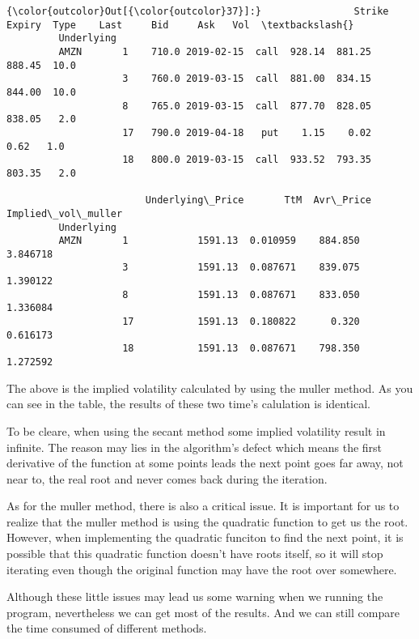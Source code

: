 \documentclass[11pt]{article}
\begin{document}
\begin{Verbatim}[commandchars=\\\{\}]
{\color{outcolor}Out[{\color{outcolor}37}]:}                Strike     Expiry  Type    Last     Bid     Ask   Vol  \textbackslash{}
         Underlying                                                             
         AMZN       1    710.0 2019-02-15  call  928.14  881.25  888.45  10.0   
                    3    760.0 2019-03-15  call  881.00  834.15  844.00  10.0   
                    8    765.0 2019-03-15  call  877.70  828.05  838.05   2.0   
                    17   790.0 2019-04-18   put    1.15    0.02    0.62   1.0   
                    18   800.0 2019-03-15  call  933.52  793.35  803.35   2.0   
         
                        Underlying\_Price       TtM  Avr\_Price  Implied\_vol\_muller  
         Underlying                                                                
         AMZN       1            1591.13  0.010959    884.850            3.846718  
                    3            1591.13  0.087671    839.075            1.390122  
                    8            1591.13  0.087671    833.050            1.336084  
                    17           1591.13  0.180822      0.320            0.616173  
                    18           1591.13  0.087671    798.350            1.272592  
\end{Verbatim}
            
    The above is the implied volatility calculated by using the muller
method. As you can see in the table, the results of these two time's
calulation is identical.

To be cleare, when using the secant method some implied volatility
result in infinite. The reason may lies in the algorithm's defect which
means the first derivative of the function at some points leads the next
point goes far away, not near to, the real root and never comes back
during the iteration.

As for the muller method, there is also a critical issue. It is
important for us to realize that the muller method is using the
quadratic function to get us the root. However, when implementing the
quadratic funciton to find the next point, it is possible that this
quadratic function doesn't have roots itself, so it will stop iterating
even though the original function may have the root over somewhere.

Although these little issues may lead us some warning when we running
the program, nevertheless we can get most of the results. And we can
still compare the time consumed of different methods.
\end{document}

